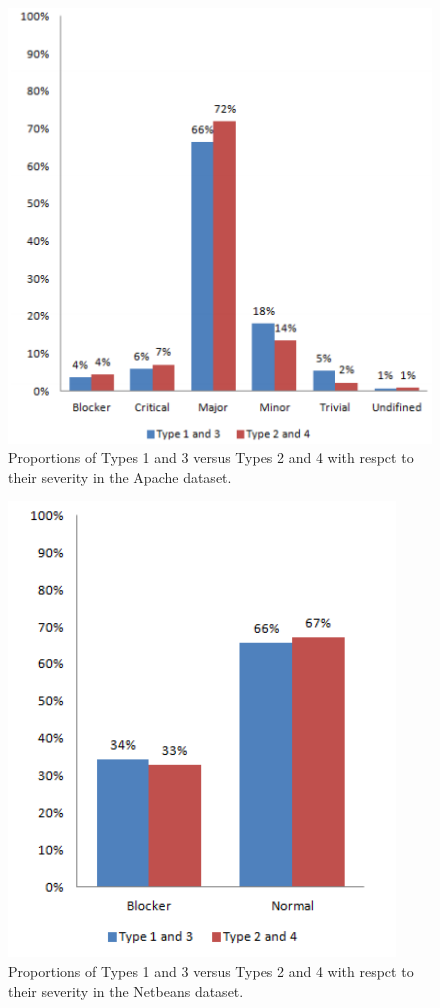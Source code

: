 \begin{figure}[h!]
  \centering
    \includegraphics[scale=0.6]{media/bug-taxo-rq2-prop-apache.png}
    \caption{Proportions of Types 1 and 3 versus Types 2 and 4 with respct to their severity in the Apache dataset.
    \label{fig:bug-taxo-rq2-prop-apache}}
\end{figure}

\begin{figure}[h!]
  \centering
    \includegraphics[scale=0.6]{media/bug-taxo-rq2-prop-netbeans.png}
    \caption{Proportions of Types 1 and 3 versus Types 2 and 4 with respct to their severity in the Netbeans dataset.
    \label{fig:bug-taxo-rq2-prop-netbeans}}
\end{figure}


